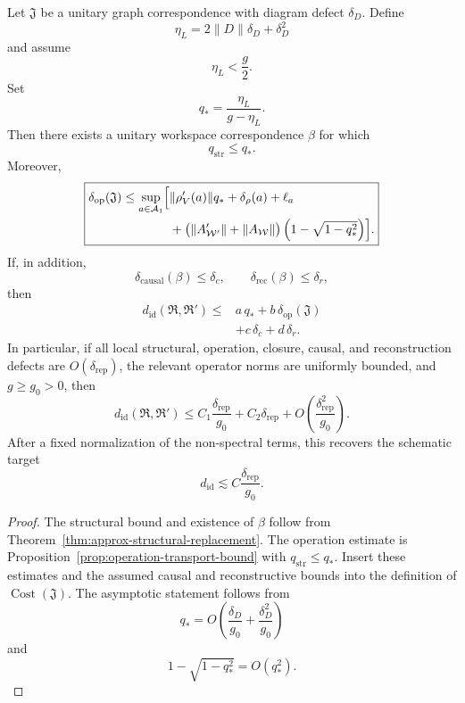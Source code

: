 \begin{theorem}\label{thm:replacement-invariance}
Let \(\mathfrak J\) be a unitary graph correspondence with diagram defect
\(\delta_D\). Define
\[
\eta_L=2\|D\|\delta_D+\delta_D^2
\]
and assume
\[
\eta_L<\frac g2.
\]
Set
\[
q_*
=
\frac{\eta_L}{g-\eta_L}.
\]
Then there exists a unitary workspace correspondence \(\beta\) for which
\[
q_{\mathrm{str}}\leq q_*.
\]
Moreover,
\[
\boxed{
\begin{aligned}
\delta_{\mathrm{op}}(\mathfrak J)
\leq
\sup_{a\in\mathcal A_1}
\Bigl[&
\|\rho_V'(a)\|q_*
+\delta_\rho(a)
+\ell_a\\
&+
\bigl(\|A_{\mathcal W'}'\|+\|A_{\mathcal W}\|\bigr)
\left(1-\sqrt{1-q_*^2}\right)
\Bigr].
\end{aligned}
}
\]
If, in addition,
\[
\delta_{\mathrm{causal}}(\beta)\leq\delta_c,
\qquad
\delta_{\mathrm{rec}}(\beta)\leq\delta_r,
\]
then
\[
\boxed{
\begin{aligned}
d_{\mathrm{id}}(\mathfrak R,\mathfrak R')
\leq
&a\,q_*+b\,\delta_{\mathrm{op}}(\mathfrak J)\\
&+c\,\delta_c+d\,\delta_r.
\end{aligned}
}
\]
In particular, if all local structural, operation, closure, causal, and
reconstruction defects are \(O(\delta_{\mathrm{rep}})\), the relevant
operator norms are uniformly bounded, and \(g\geq g_0>0\), then
\[
\boxed{
d_{\mathrm{id}}(\mathfrak R,\mathfrak R')
\leq
C_1\frac{\delta_{\mathrm{rep}}}{g_0}
+C_2\delta_{\mathrm{rep}}
+O\!\left(\frac{\delta_{\mathrm{rep}}^2}{g_0}\right).
}
\]
After a fixed normalization of the non-spectral terms, this recovers the
schematic target
\[
d_{\mathrm{id}}
\lesssim
C\frac{\delta_{\mathrm{rep}}}{g_0}.
\]
\end{theorem}

\begin{proof}
The structural bound and existence of \(\beta\) follow from
Theorem~\ref{thm:approx-structural-replacement}. The operation estimate is
Proposition~\ref{prop:operation-transport-bound} with
\(q_{\mathrm{str}}\leq q_*\). Insert these estimates and the assumed causal
and reconstructive bounds into the definition of
\(\operatorname{Cost}(\mathfrak J)\). The asymptotic statement follows from
\[
q_*=O\!\left(\frac{\delta_D}{g_0}
+\frac{\delta_D^2}{g_0}\right)
\]
and
\[
1-\sqrt{1-q_*^2}=O(q_*^2).
\]
\end{proof}

